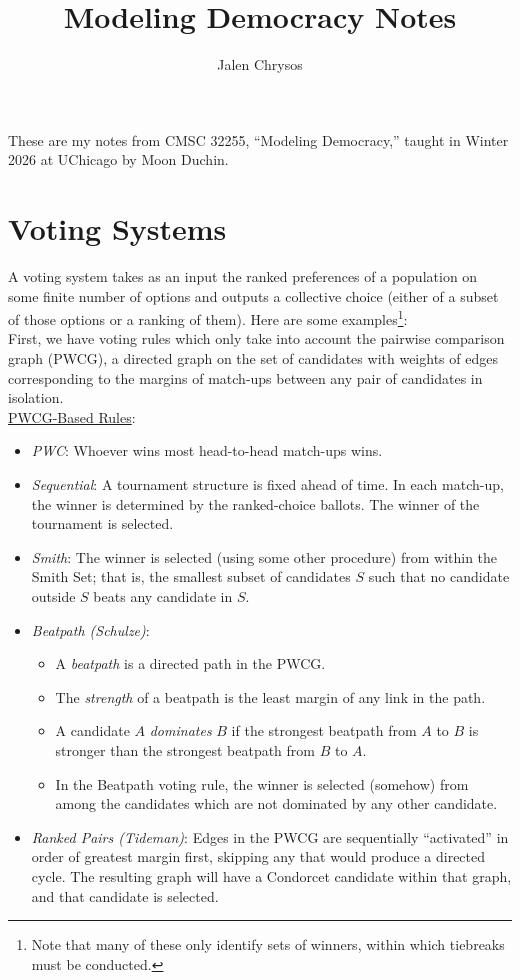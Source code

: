 \documentclass{amsart}
\title{Modeling Democracy Notes}
\author{Jalen Chrysos}
\begin{document}
	
\maketitle

These are my notes from CMSC 32255, ``Modeling Democracy,'' taught in Winter 2026 at UChicago by Moon Duchin.

\tableofcontents

\newpage 

\section{Voting Systems}

A voting system takes as an input the ranked preferences of a population on some finite number of options and outputs a collective choice (either of a subset of those options or a ranking of them). Here are some examples\footnote{Note that many of these only identify sets of winners, within which tiebreaks must be conducted.}:\\

First, we have voting rules which only take into account the pairwise comparison graph (PWCG), a directed graph on the set of candidates with weights of edges corresponding to the margins of match-ups between any pair of candidates in isolation.\\

\noindent \underline{PWCG-Based Rules}:
\begin{itemize}
	\item \textit{PWC}: Whoever wins most head-to-head match-ups wins.
	\item \textit{Sequential}: A tournament structure is fixed ahead of time. In each match-up, the winner is determined by the ranked-choice ballots. The winner of the tournament is selected.
	\item \textit{Smith}: The winner is selected (using some other procedure) from within the Smith Set; that is, the smallest subset of candidates $S$ such that no candidate outside $S$ beats any candidate in $S$.
	\item \textit{Beatpath (Schulze)}: 
	\begin{itemize}
		\item A \textit{beatpath} is a directed path in the PWCG.
		\item The \textit{strength} of a beatpath is the least margin of any link in the path.
		\item A candidate $A$ \textit{dominates} $B$ if the strongest beatpath from $A$ to $B$ is stronger than the strongest beatpath from $B$ to $A$.
		\item In the Beatpath voting rule, the winner is selected (somehow) from among the candidates which are not dominated by any other candidate.
	\end{itemize}
	\item \textit{Ranked Pairs (Tideman)}: Edges in the PWCG are sequentially ``activated'' in order of greatest margin first, skipping any that would produce a directed cycle. The resulting graph will have a Condorcet candidate within that graph, and that candidate is selected.\\
\end{itemize}
\end{document}
